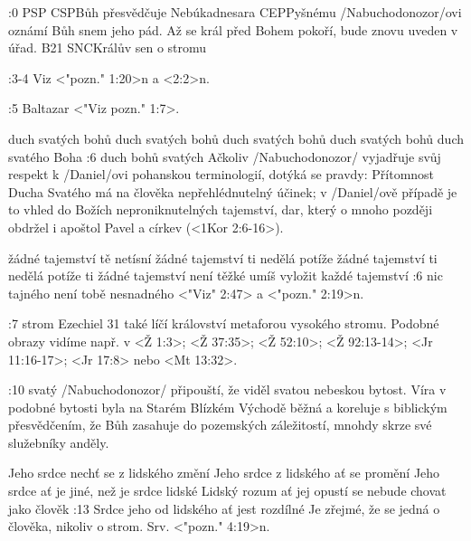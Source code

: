 :0 {} 
% 
        {PSP}{}%
        {CSP}{Bůh přesvědčuje Nebúkadnesara}%
        {CEP}{Pyšnému \x/Nabuchodonozor/ovi oznámí Bůh snem jeho pád.\nl 
                Až se král před Bohem pokoří, bude znovu uveden v úřad.}%
        {B21}{}%
        {SNC}{Králův sen o stromu}%

             

:3-4 {} Viz <"pozn." 1:20>n a <2:2>n.

:5 {Baltazar} <"Viz pozn." 1:7>.

    {duch svatých bohů}   %
    {duch svatých bohů}   %
    {duch svatých bohů}   %
    {duch svatých bohů}   %
    {duch svatého Boha}   %
:6 {duch bohů svatých} Ačkoliv \x/Nabuchodonozor/ vyjadřuje svůj respekt k \x/Daniel/ovi pohanskou terminologií, dotýká se pravdy: Přítomnost Ducha Svatého má na člověka nepřehlédnutelný účinek; v \x/Daniel/ově případě je to vhled do Božích neproniknutelných tajemství, dar, který o mnoho později obdržel i apoštol Pavel a církev  (<1Kor 2:6-16>).

    {žádné tajemství tě netísní}   %
    {žádné tajemství ti nedělá potíže}   %
    {žádné tajemství ti nedělá potíže}   %
    {ti žádné tajemství není těžké}   %
    {umíš vyložit každé tajemství}   %
:6 {nic tajného není tobě nesnadného}  <"Viz" 2:47> a <"pozn." 2:19>n.

:7 {strom} Ezechiel 31 také líčí království metaforou vysokého stromu. Podobné obrazy vidíme např. v <Ž 1:3>; <Ž 37:35>; <Ž 52:10>; <Ž 92:13-14>; <Jr 11:16-17>; <Jr 17:8> nebo <Mt 13:32>. 

:10 {svatý}  \x/Nabuchodonozor/ připouští, že viděl svatou nebeskou bytost. Víra v podobné bytosti byla na Starém Blízkém Východě běžná a koreluje s biblickým přesvědčením, že Bůh zasahuje do pozemských záležitostí, mnohdy skrze své služebníky anděly.

    {Jeho srdce nechť se z lidského změní}   %
    {Jeho srdce z lidského ať se promění}   %
    {Jeho srdce ať je jiné, než je srdce lidské}   %
    {Lidský rozum ať jej opustí}   %
    {se nebude chovat jako člověk}   %
:13 {Srdce jeho od lidského ať jest rozdílné}
    Je zřejmé, že se jedná o člověka, nikoliv o strom. Srv. <"pozn." 4:19>n.

